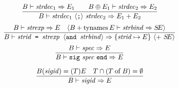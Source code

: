 \vspace{6pt}
\begin{equation}                %
\frac{ \B\ts\strdec_1\ra\E_1\qquad
       \B\oplus\E_1\ts\strdec_2\ra\E_2 }
     { \B\ts\seqstrdec\ra\plusmap{\E_1}{\E_2} }
\end{equation}
\oldpagebreak
{}
\begin{equation}                %
\label{structure-binding-rule}
\frac{ 
       \B\ts\strexp\ra\E\quad
       \langle\plusmap{\B}{\TyNamesFcn\E}\ts
                                      \strbind\ra\SE\rangle
     }
     { \B\ts\barestrbindera\ra\{\strid\mapsto\E\}
       \ \langle +\ \SE\rangle}\index{41.1}
\end{equation}%
%
%
\begin{equation}                %
\label{encapsulating-sigexp-rule}
\frac{\B\ts\spec\ra\E }
     {\B\ts\encsigexp\ra  \E }\index{41.2}
\end{equation}

\begin{equation}                %
\label{signature-identifier-rule}
\frac{  \B(\sigid) = (\T)\E \quad \T\cap (\of{\T}{\B}) = \emptyset}
     { \B\ts\sigid\ra\E }
\end{equation}

